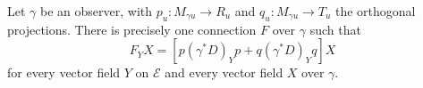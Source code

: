 Let $\gamma$ be an observer, with $p_u: M_{\gamma u} \rightarrow R_u$ and $q_u: M_{\gamma u} \rightarrow T_u$ the orthogonal projections. There is precisely one connection $F$ over $\gamma$ such that
$$F_Y X = [p(\gamma^* D)_Y p + q(\gamma^* D)_Y q]X$$
for every vector field $Y$ on $\mathcal{E}$ and every vector field $X$ over $\gamma$.
